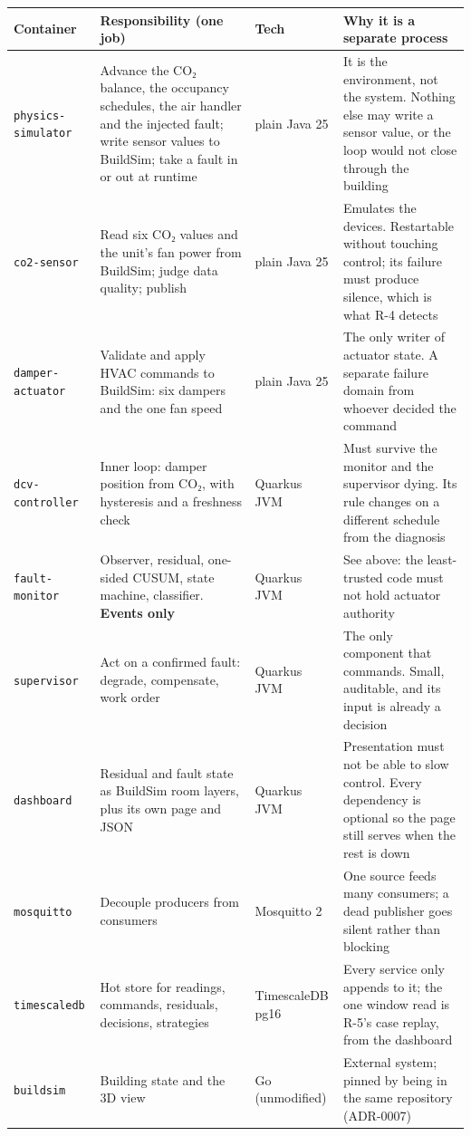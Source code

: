 \begin{longtable}[]{@{}
  >{\raggedright\arraybackslash}p{}
  >{\raggedright\arraybackslash}p{}
  >{\raggedright\arraybackslash}p{}
  >{\raggedright\arraybackslash}p{}@{}}
\toprule
\textbf{Container} & \textbf{Responsibility (one job)} & \textbf{Tech} & \textbf{Why it is a
separate process} \\
\midrule
\endhead
\texttt{physics-simulator} & Advance the CO₂ balance, the occupancy schedules, the air handler and
the injected fault; write sensor values to BuildSim; take a fault in or out at runtime & plain Java 25 & It is the environment, not
the system. Nothing else may write a sensor value, or the loop would not close through the
building \\
\texttt{co2-sensor} & Read six CO₂ values and the unit's fan power from BuildSim; judge data
quality; publish & plain Java 25 & Emulates the devices. Restartable without touching control;
its failure must produce silence, which is what R-4 detects \\
\texttt{damper-actuator} & Validate and apply HVAC commands to BuildSim: six dampers and the one
fan speed & plain Java 25 & The only writer of actuator state. A separate failure domain from
whoever decided the command \\
\texttt{dcv-controller} & Inner loop: damper position from CO₂, with hysteresis and a freshness
check & Quarkus JVM & Must survive the monitor and the supervisor dying. Its rule changes on a
different schedule from the diagnosis \\
\texttt{fault-monitor} & Observer, residual, one-sided CUSUM, state machine, classifier.
\textbf{Events only} & Quarkus JVM & See above: the least-trusted code must not hold actuator
authority \\
\texttt{supervisor} & Act on a confirmed fault: degrade, compensate, work order & Quarkus JVM &
The only component that commands. Small, auditable, and its input is already a decision \\
\texttt{dashboard} & Residual and fault state as BuildSim room layers, plus its own page and JSON
& Quarkus JVM & Presentation must not be able to slow control. Every dependency is optional so the
page still serves when the rest is down \\
\texttt{mosquitto} & Decouple producers from consumers & Mosquitto 2 & One source feeds many
consumers; a dead publisher goes silent rather than blocking \\
\texttt{timescaledb} & Hot store for readings, commands, residuals, decisions, strategies &
TimescaleDB pg16 & Every service only appends to it; the one window read is R-5's case replay,
from the dashboard \\*
\texttt{buildsim} & Building state and the 3D view & Go (unmodified) & External system; pinned by
being in the same repository (ADR-0007) \\
\bottomrule
\end{longtable}

